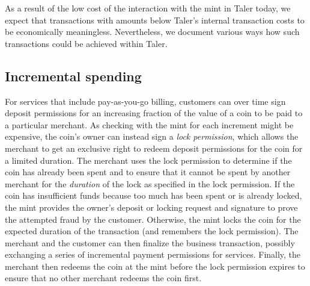 \documentclass{llncs}
\begin{document}
As a result of the low cost of the interaction with the mint in Taler
today, we expect that transactions with amounts below Taler's internal
transaction costs to be economically meaningless.  Nevertheless, we
document various ways how such transactions could be achieved within
Taler.



\subsection{Incremental spending}

For services that include pay-as-you-go billing, customers can over
time sign deposit permissions for an increasing fraction of the value
of a coin to be paid to a particular merchant.  As checking with the
mint for each increment might be expensive, the coin's owner can
instead sign a {\em lock permission}, which allows the merchant to get
an exclusive right to redeem deposit permissions for the coin for a
limited duration.  The merchant uses the lock permission to determine
if the coin has already been spent and to ensure that it cannot be
spent by another merchant for the {\em duration} of the lock as
specified in the lock permission.  If the coin has insufficient funds
because too much has been spent or is
already locked, the mint provides the owner's deposit or locking
request and signature to prove the attempted fraud by the customer.
Otherwise, the mint locks the coin for the expected duration of the
transaction (and remembers the lock permission).  The merchant and the
customer can then finalize the business transaction, possibly
exchanging a series of incremental payment permissions for services.
Finally, the merchant then redeems the coin at the mint before the
lock permission expires to ensure that no other merchant redeems the
coin first.
\end{document}
